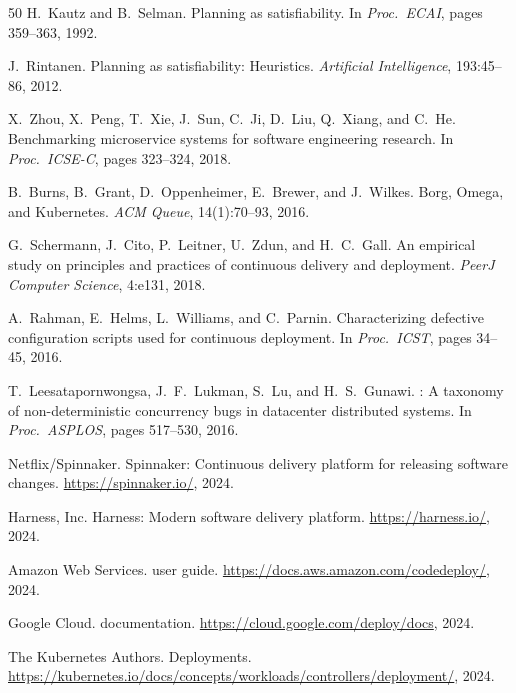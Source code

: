 \documentclass[10pt,twocolumn]{article}
\begin{document}
\begin{thebibliography}{50}
H.~Kautz and B.~Selman.
\newblock Planning as satisfiability.
\newblock In \emph{Proc.\ ECAI}, pages 359--363, 1992.

J.~Rintanen.
\newblock Planning as satisfiability: Heuristics.
\newblock \emph{Artificial Intelligence}, 193:45--86, 2012.

X.~Zhou, X.~Peng, T.~Xie, J.~Sun, C.~Ji, D.~Liu, Q.~Xiang, and C.~He.
\newblock Benchmarking microservice systems for software engineering research.
\newblock In \emph{Proc.\ ICSE-C}, pages 323--324, 2018.

B.~Burns, B.~Grant, D.~Oppenheimer, E.~Brewer, and J.~Wilkes.
\newblock Borg, {Omega}, and {Kubernetes}.
\newblock \emph{ACM Queue}, 14(1):70--93, 2016.

G.~Schermann, J.~Cito, P.~Leitner, U.~Zdun, and H.~C.~Gall.
\newblock An empirical study on principles and practices of continuous delivery and deployment.
\newblock \emph{PeerJ Computer Science}, 4:e131, 2018.

A.~Rahman, E.~Helms, L.~Williams, and C.~Parnin.
\newblock Characterizing defective configuration scripts used for continuous deployment.
\newblock In \emph{Proc.\ ICST}, pages 34--45, 2016.

T.~Leesatapornwongsa, J.~F.~Lukman, S.~Lu, and H.~S.~Gunawi.
: A taxonomy of non-deterministic concurrency bugs in datacenter distributed systems.
\newblock In \emph{Proc.\ ASPLOS}, pages 517--530, 2016.

{Netflix/Spinnaker}.
\newblock Spinnaker: Continuous delivery platform for releasing software changes.
\newblock \url{https://spinnaker.io/}, 2024.

{Harness, Inc.}
\newblock Harness: Modern software delivery platform.
\newblock \url{https://harness.io/}, 2024.

{Amazon Web Services}.
 user guide.
\newblock \url{https://docs.aws.amazon.com/codedeploy/}, 2024.

{Google Cloud}.
 documentation.
\newblock \url{https://cloud.google.com/deploy/docs}, 2024.

{The Kubernetes Authors}.
\newblock Deployments.
\newblock \url{https://kubernetes.io/docs/concepts/workloads/controllers/deployment/}, 2024.


\end{thebibliography}
\end{document}
